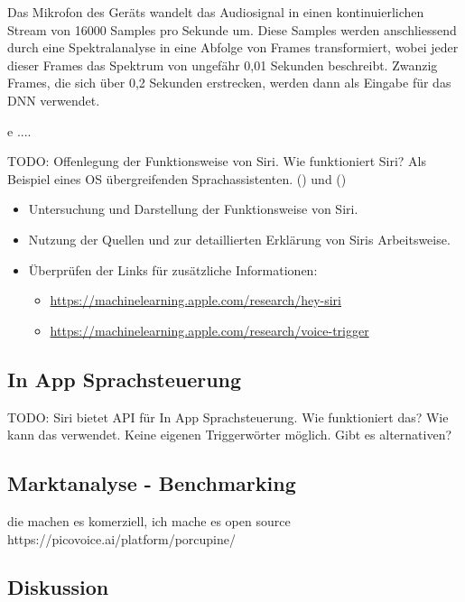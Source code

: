 \documentclass[11pt,a4paper]{article}
\begin{document}
\noindent \newline
Das Mikrofon des Geräts wandelt das Audiosignal in einen kontinuierlichen Stream von 16000 Samples 
pro Sekunde um. Diese Samples werden anschliessend durch eine Spektralanalyse in eine Abfolge von 
Frames transformiert, wobei jeder dieser Frames das Spektrum von ungefähr 0,01 Sekunden beschreibt.
Zwanzig Frames, die sich über 0,2 Sekunden erstrecken, werden dann als Eingabe für das DNN 
verwendet.
 
e ....


\noindent \newline
TODO: Offenlegung der Funktionsweise von Siri. Wie funktioniert Siri? Als Beispiel eines OS 
übergreifenden Sprachassistenten.
(\cite{siri2017hey}) und (\cite{apple2023voice}) 

\begin{itemize}
    \item Untersuchung und Darstellung der Funktionsweise von Siri.
    \item Nutzung der Quellen \cite{siri2017hey} und \cite{apple2023voice} zur detaillierten 
    Erklärung von Siris Arbeitsweise.
    \item Überprüfen der Links für zusätzliche Informationen:
    \begin{itemize}
        \item \url{https://machinelearning.apple.com/research/hey-siri}
        \item \url{https://machinelearning.apple.com/research/voice-trigger}
    \end{itemize}
\end{itemize}

\subsection{In App Sprachsteuerung}
TODO: Siri bietet API für In App Sprachsteuerung. Wie funktioniert das? Wie kann das verwendet.
Keine eigenen Triggerwörter möglich. Gibt es alternativen?

\subsection{Marktanalyse - Benchmarking}

die machen es komerziell, ich mache es open source
https://picovoice.ai/platform/porcupine/ 

\subsection{Diskussion}
\end{document}
